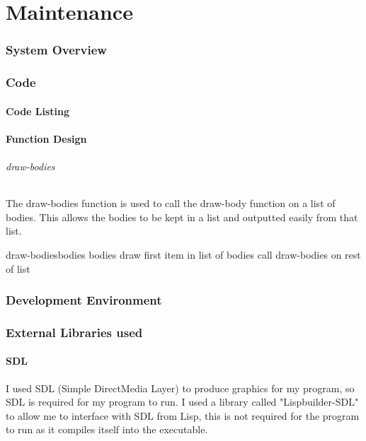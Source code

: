 \part{Maintenance}

\section{System Overview}

\section{Code}



\subsection{Code Listing}


\subsection{Function Design}

\paragraph{draw-bodies}
The draw-bodies function is used to call the draw-body function on a list of
bodies. This allows the bodies to be kept in a list and outputted easily from
that list.
\begin{pseudocode}{draw-bodies}{bodies}
	\IF bodies
	\THEN \BEGIN
		draw first item in list of bodies
		call draw-bodies on rest of list
		\END
	\ELSE
	
\end{pseudocode}



\section{Development Environment}

\section{External Libraries used}
\subsection{SDL}
I used SDL (Simple DirectMedia Layer) to produce graphics for my program, so SDL
is required for my program to run. I used a library called "Lispbuilder-SDL" to
allow me to interface with SDL from Lisp, this is not required for the program
to run as it compiles itself into the executable.

